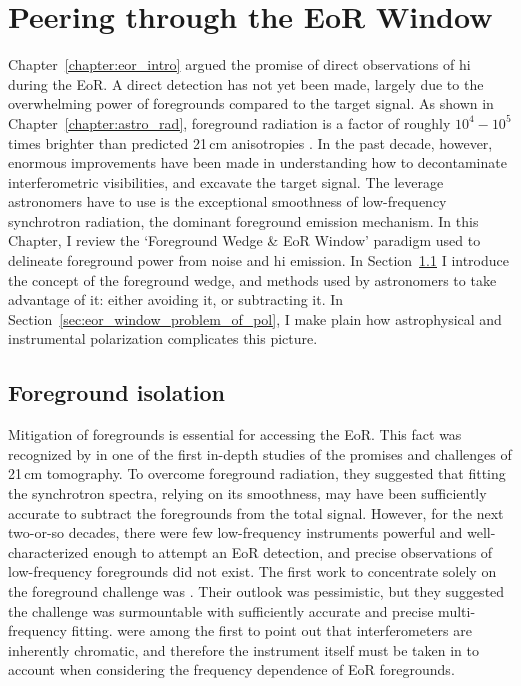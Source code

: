 \chapter{Peering through the EoR Window}
\label{chapter:eor_window_theory}

Chapter~\ref{chapter:eor_intro} argued the promise of direct observations of {\sc hi} during the EoR. A direct detection has not yet been made, largely due to the overwhelming power of foregrounds compared to the target signal. As shown in Chapter~\ref{chapter:astro_rad}, foreground radiation is a factor of roughly $10^4 - 10^5$ times brighter than predicted 21\,cm anisotropies .  In the past decade, however, enormous improvements have been made in understanding how to decontaminate interferometric visibilities, and excavate the target signal. The leverage astronomers have to use is the exceptional smoothness of low-frequency synchrotron radiation, the dominant foreground emission mechanism. In this Chapter, I review the `Foreground Wedge \& EoR Window' paradigm used to delineate foreground power from noise and {\sc hi} emission. In Section~\ref{sec:eor_window_foreground_wedge} I introduce the concept of the foreground wedge, and methods used by astronomers to take advantage of it: either avoiding it, or subtracting it. In Section~\ref{sec:eor_window_problem_of_pol}, I make plain how astrophysical and instrumental polarization complicates this picture.

\section{Foreground isolation}
\label{sec:eor_window_foreground_wedge}

Mitigation of foregrounds is essential for accessing the EoR. This fact was recognized by \cite{Madau.97} in one of the first in-depth studies of the promises and challenges of 21\,cm tomography. To overcome foreground radiation, they suggested that fitting the synchrotron spectra, relying on its smoothness, may have been sufficiently accurate to subtract the foregrounds from the total signal.
However, for the next two-or-so decades, there were few low-frequency instruments powerful and well-characterized enough to attempt an EoR detection, and precise observations of low-frequency foregrounds did not exist. The first work to concentrate solely on the foreground challenge was \cite{DiMatteo.02}. Their outlook was pessimistic, but they suggested the challenge was surmountable with sufficiently accurate and precise multi-frequency fitting. \cite{Peng.03} were among the first to point out that interferometers are inherently chromatic, and therefore the instrument itself must be taken in to account when considering the frequency dependence of EoR foregrounds.


